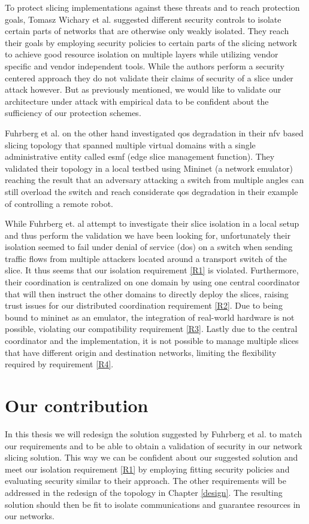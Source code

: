 To protect slicing implementations against these threats and to reach protection goals, Tomasz Wichary et al. \cite{SE3} suggested different security controls to isolate certain parts of networks that are otherwise only weakly isolated. They reach their goals by employing security policies to certain parts of the slicing network to achieve good resource isolation on multiple layers while utilizing vendor specific and vendor independent tools. While the authors perform a security centered approach they do not validate their claims of security of a slice under attack however. But as previously mentioned, we would like to validate our architecture under attack with empirical data to be confident about the sufficiency of our protection schemes.

Fuhrberg et al. \cite{SE4} on the other hand investigated \acrshort{qos} degradation in their \acrshort{nfv} based slicing topology that spanned multiple virtual domains with a single administrative entity called \acrshort{esmf} (edge slice management function). They validated their topology in a local testbed using Mininet \cite{mininet} (a network emulator) reaching the result that an adversary attacking a switch from multiple angles can still overload the switch and reach considerate \acrshort{qos} degradation in their example of controlling a remote robot.

While Fuhrberg et. al \cite{SE4} attempt to investigate their slice isolation in a local setup and thus perform the validation we have been looking for, unfortunately their isolation seemed to fail under denial of service (\acrshort{dos}) on a switch when sending traffic flows from multiple attackers located around a transport switch of the slice. It thus seems that our isolation requirement \ref{R1} is violated. Furthermore, their coordination is centralized on one domain by using one central coordinator that will then instruct the other domains to directly deploy the slices, raising trust issues for our distributed coordination requirement \ref{R2}. Due to being bound to mininet \cite{mininet} as an emulator, the integration of real-world hardware is not possible, violating our compatibility requirement \ref{R3}. Lastly due to the central coordinator and the implementation, it is not possible to manage multiple slices that have different origin and destination networks, limiting the flexibility required by requirement \ref{R4}.


\section{Our contribution}
In this thesis we will redesign the solution suggested by Fuhrberg et al. \cite{SE4} to match our requirements and to be able to obtain a validation of security in our network slicing solution. This way we can be confident about our suggested solution and meet our isolation requirement \ref{R1} by employing fitting security policies and evaluating security similar to their approach. The other requirements will be addressed in the redesign of the topology in Chapter \ref{design}. The resulting solution should then be fit to isolate communications and guarantee resources in our networks.


